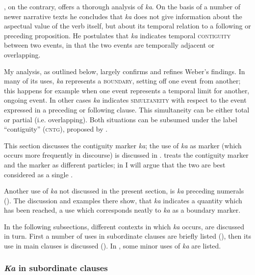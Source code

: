\citet[33]{WeberR2003}, on the contrary, offers a thorough analysis of \textit{ka}. On the basis of a number of newer narrative texts he concludes that \textit{ka} does not give information about the aspectual value of the verb itself, but about its temporal relation to a following or preceding proposition. He postulates that \textit{ka} indicates temporal \textsc{contiguity} between two events, in that the two events are temporally adjacent or overlapping. 

My analysis, as outlined below, largely confirms and refines Weber’s findings. In many of its uses, \textit{ka} represents a \textsc{boundary}, setting off one event from another; this happens for example when one event represents a temporal limit for another, ongoing event. In other cases \textit{ka} indicates \textsc{simultaneity} with respect to the event expressed in a preceding or following clause. This simultaneity can be either total or partial (i.e. overlapping). Both situations can be subsumed under the label “contiguity” (\textsc{cntg}), proposed by \citet{WeberR2003}. 

This section discusses the contiguity marker \textit{ka}; the use of \textit{ka} as  marker (which occurs more frequently in discourse) is discussed in . \citet{WeberR2003} treats the contiguity marker and the  marker as different particles; in  I will argue that the two are best considered as a single .

Another use of \textit{ka} not discussed in the present section, is \textit{ka} preceding numerals (). The discussion and examples there show, that \textit{ka} indicates a quantity which has been reached, a use which corresponds neatly to \textit{ka} as a boundary marker. 

In the following subsections, different contexts in which \textit{ka} occurs, are discussed in turn. First a number of uses in subordinate clauses are briefly listed (), then its use in main clauses is discussed (). In , some minor uses of \textit{ka} are listed.

\subsubsection{\textit{Ka} in subordinate clauses}\label{sec:7.2.6.2}

